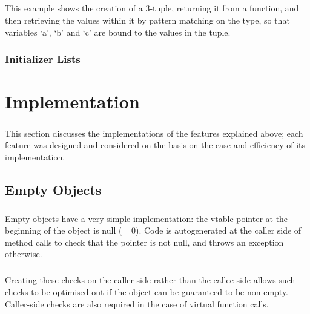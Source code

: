 \documentclass[12pt,twoside,notitlepage]{report}
\begin{document}
\paragraph{}
This example shows the creation of a 3-tuple, returning it from a function, and then retrieving the values within it by pattern matching on the type, so that variables `a', `b' and `c' are bound to the values in the tuple.

\subsection{Initializer Lists}

\paragraph{}


\cleardoublepage

\chapter{Implementation}

\paragraph{}
This section discusses the implementations of the features explained above; each feature was designed and considered on the basis on the ease and efficiency of its implementation.

\section{Empty Objects}

\paragraph{}
Empty objects have a very simple implementation: the vtable pointer at the beginning of the object is null (= 0). Code is autogenerated at the caller side of method calls to check that the pointer is not null, and throws an exception otherwise.

\paragraph{}
Creating these checks on the caller side rather than the callee side allows such checks to be optimised out if the object can be guaranteed to be non-empty. Caller-side checks are also required in the case of virtual function calls.
\end{document}
